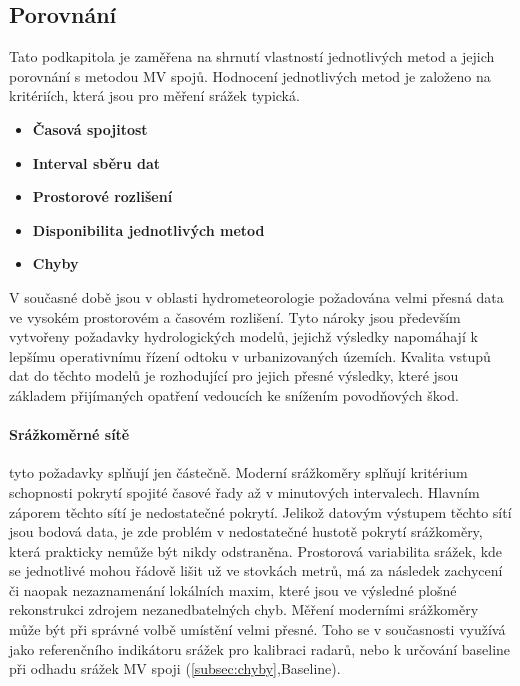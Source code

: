 \documentclass[a4paper,12pt,oneside]{report}
\begin{document}
\subsection{Porovnání}
Tato podkapitola je zaměřena na shrnutí vlastností jednotlivých metod a jejich porovnání s metodou MV spojů. Hodnocení jednotlivých metod je založeno na kritériích, která jsou pro měření srážek typická.
\begin{itemize}
\item\textbf{Časová spojitost}
\item\textbf{Interval sběru dat}  
\item\textbf{Prostorové rozlišení}
\item\textbf{Disponibilita jednotlivých metod}
\item\textbf{Chyby}
\end{itemize}
V současné době jsou v oblasti hydrometeorologie požadována velmi přesná data ve vysokém prostorovém a časovém rozlišení. Tyto nároky jsou především vytvořeny požadavky hydrologických modelů, jejichž výsledky napomáhají k lepšímu operativnímu řízení odtoku v urbanizovaných územích. Kvalita vstupů dat do těchto modelů je rozhodující pro jejich přesné výsledky, které jsou základem přijímaných opatření vedoucích ke snížením povodňových škod.

\paragraph*{Srážkoměrné sítě} 
tyto požadavky splňují jen částečně. Moderní srážkoměry splňují kritérium schopnosti pokrytí spojité časové řady až v minutových intervalech. Hlavním záporem těchto sítí je nedostatečné pokrytí. Jelikož datovým výstupem těchto sítí jsou bodová data, je zde problém v nedostatečné hustotě pokrytí srážkoměry, která prakticky nemůže být nikdy odstraněna. Prostorová variabilita srážek, kde se jednotlivé mohou řádově lišit už ve stovkách metrů, má za následek zachycení či naopak nezaznamenání lokálních maxim, které jsou ve výsledné plošné rekonstrukci zdrojem nezanedbatelných chyb. Měření moderními srážkoměry může být při správné volbě umístění velmi přesné. Toho se v současnosti využívá jako referenčního indikátoru srážek pro kalibraci radarů, nebo k určování baseline při odhadu srážek MV spoji (\ref{subsec:chyby},Baseline).
\end{document}

